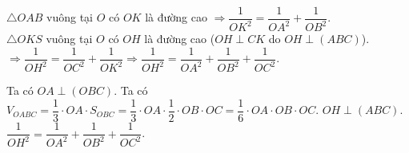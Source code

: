 \begin{ex}
{  $\triangle OAB$ vuông tại  $O$ có $OK$ là đường cao $\Rightarrow \dfrac{1}{OK^2}=\dfrac{1}{OA^2}+\dfrac{1}{OB^2}$.\\
  $\triangle OKS$ vuông  tại $O$ có $OH$ là đường cao ($OH\perp CK$ do $OH \perp (ABC)$).\\
  $\Rightarrow  \dfrac{1}{OH^2}=\dfrac{1}{OC^2}+\dfrac{1}{OK^2} \Rightarrow \dfrac{1}{OH^2}=\dfrac{1}{OA^2}+\dfrac{1}{OB^2}+\dfrac{1}{OC^2}$.
  \begin{itemchoice}
   \itemch  Ta có $OA\perp (OBC)$.
   \itemch Ta có $V_{OABC}=\dfrac{1}{3}\cdot  OA\cdot S_{OBC}=\dfrac{1}{3}\cdot OA\cdot\dfrac{1}{2}\cdot OB\cdot OC=\dfrac{1}{6}\cdot OA\cdot OB\cdot OC$.
   \itemch $OH \perp  (ABC)$.
   \itemch $\dfrac{1}{OH^2}=\dfrac{1}{OA^2}+\dfrac{1}{OB^2}+\dfrac{1}{OC^2}$. 
  \end{itemchoice}
  }
\end{ex}

